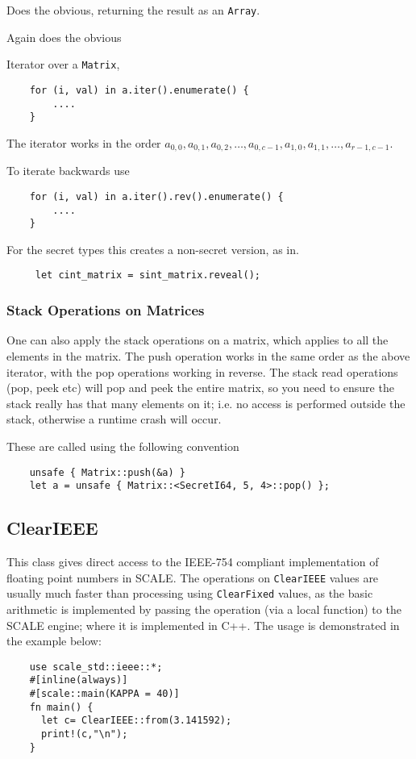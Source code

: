 Does the obvious, returning the result as an \verb|Array|.

Again does the obvious


Iterator over a \verb|Matrix|,
\begin{lstlisting}
    for (i, val) in a.iter().enumerate() {
        ....
    }
\end{lstlisting}
The iterator works in the order
$a_{0,0}, a_{0,1}, a_{0,2}, \ldots, a_{0,c-1}, a_{1,0}, a_{1,1}, \ldots, a_{r-1,c-1}$.

\noindent
To iterate backwards use
\begin{lstlisting}
    for (i, val) in a.iter().rev().enumerate() {
        ....
    }
\end{lstlisting}

For the secret types this creates a non-secret version, as in.
\begin{lstlisting}
     let cint_matrix = sint_matrix.reveal();
\end{lstlisting}

\subsubsection{Stack Operations on Matrices}
One can also apply the stack operations on a matrix, which
applies to all the elements in the matrix.
The push operation works in the same order as the above
iterator, with the pop operations working in reverse.
The stack read operations (pop, peek etc) will pop and peek
the entire matrix, so you need to ensure the stack really has
that many elements on it; i.e. no access is performed outside
the stack, otherwise a runtime crash will occur.

These are called using the following convention
\begin{lstlisting}
    unsafe { Matrix::push(&a) }
    let a = unsafe { Matrix::<SecretI64, 5, 4>::pop() };
\end{lstlisting}

\subsection{ClearIEEE}
This class gives direct access to the IEEE-754 compliant implementation
of floating point numbers in SCALE.
The operations on \verb|ClearIEEE| values are usually much
faster than processing using \verb|ClearFixed| values, as
the basic arithmetic is implemented by passing the operation
(via a local function) to the SCALE engine; where it is implemented
in C++.
The usage is demonstrated in the example below:
\begin{lstlisting}
    use scale_std::ieee::*;
    #[inline(always)]
    #[scale::main(KAPPA = 40)]
    fn main() {
      let c= ClearIEEE::from(3.141592);
      print!(c,"\n");
    }
\end{lstlisting}

